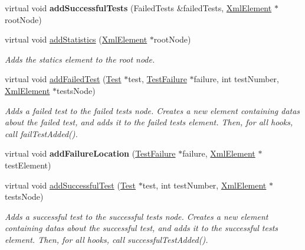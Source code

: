 \begin{DoxyCompactItemize}
\item 
\hypertarget{class_xml_outputter_a57805372b9f3ceeafd43a1e637f8b888}{virtual void {\bfseries add\-Successful\-Tests} (Failed\-Tests \&failed\-Tests, \hyperlink{class_xml_element}{Xml\-Element} $\ast$root\-Node)}\label{class_xml_outputter_a57805372b9f3ceeafd43a1e637f8b888}

\item 
virtual void \hyperlink{class_xml_outputter_a8ba291b109ac04b9f652c027c3318f14}{add\-Statistics} (\hyperlink{class_xml_element}{Xml\-Element} $\ast$root\-Node)
\begin{DoxyCompactList}\small\item\em Adds the statics element to the root node. \end{DoxyCompactList}\item 
\hypertarget{class_xml_outputter_abbe12c670f490cbe29b8be6d9ff174e6}{virtual void \hyperlink{class_xml_outputter_abbe12c670f490cbe29b8be6d9ff174e6}{add\-Failed\-Test} (\hyperlink{class_test}{Test} $\ast$test, \hyperlink{class_test_failure}{Test\-Failure} $\ast$failure, int test\-Number, \hyperlink{class_xml_element}{Xml\-Element} $\ast$tests\-Node)}\label{class_xml_outputter_abbe12c670f490cbe29b8be6d9ff174e6}

\begin{DoxyCompactList}\small\item\em Adds a failed test to the failed tests node. Creates a new element containing datas about the failed test, and adds it to the failed tests element. Then, for all hooks, call fail\-Test\-Added(). \end{DoxyCompactList}\item 
\hypertarget{class_xml_outputter_a1afa9344722155ae8ea3d7d67493ade3}{virtual void {\bfseries add\-Failure\-Location} (\hyperlink{class_test_failure}{Test\-Failure} $\ast$failure, \hyperlink{class_xml_element}{Xml\-Element} $\ast$test\-Element)}\label{class_xml_outputter_a1afa9344722155ae8ea3d7d67493ade3}

\item 
\hypertarget{class_xml_outputter_a025e0e041db1ec557e9af2887a24dd9e}{virtual void \hyperlink{class_xml_outputter_a025e0e041db1ec557e9af2887a24dd9e}{add\-Successful\-Test} (\hyperlink{class_test}{Test} $\ast$test, int test\-Number, \hyperlink{class_xml_element}{Xml\-Element} $\ast$tests\-Node)}\label{class_xml_outputter_a025e0e041db1ec557e9af2887a24dd9e}

\begin{DoxyCompactList}\small\item\em Adds a successful test to the successful tests node. Creates a new element containing datas about the successful test, and adds it to the successful tests element. Then, for all hooks, call successful\-Test\-Added(). \end{DoxyCompactList}\end{DoxyCompactItemize}
